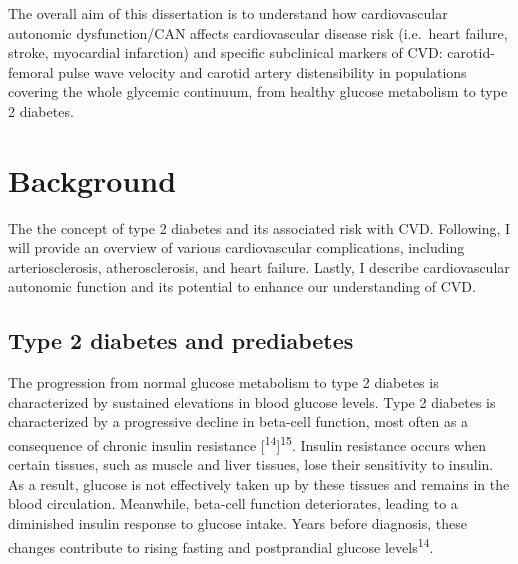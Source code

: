 \documentclass[
  a4paper,
  headsepline=true,
  open=any]{scrbook}
\begin{document}
The overall aim of this dissertation is to understand how cardiovascular
autonomic dysfunction/CAN affects cardiovascular disease risk
(i.e.~heart failure, stroke, myocardial infarction) and specific
subclinical markers of CVD: carotid-femoral pulse wave velocity and
carotid artery distensibility in populations covering the whole glycemic
continuum, from healthy glucose metabolism to type 2 diabetes.


\hypertarget{background}{%
\chapter{Background}\label{background}}

The the concept of type 2 diabetes and its associated risk with CVD.
Following, I will provide an overview of various cardiovascular
complications, including arteriosclerosis, atherosclerosis, and heart
failure. Lastly, I describe cardiovascular autonomic function and its
potential to enhance our understanding of CVD.

\hypertarget{type-2-diabetes-and-prediabetes}{%
\section{Type 2 diabetes and
prediabetes}\label{type-2-diabetes-and-prediabetes}}

The progression from normal glucose metabolism to type 2 diabetes is
characterized by sustained elevations in blood glucose levels. Type 2
diabetes is characterized by a progressive decline in beta-cell
function, most often as a consequence of chronic insulin resistance
{[}\textsuperscript{14}{]}\textsuperscript{15}. Insulin resistance
occurs when certain tissues, such as muscle and liver tissues, lose
their sensitivity to insulin. As a result, glucose is not effectively
taken up by these tissues and remains in the blood circulation.
Meanwhile, beta-cell function deteriorates, leading to a diminished
insulin response to glucose intake. Years before diagnosis, these
changes contribute to rising fasting and postprandial glucose
levels\textsuperscript{14}.
\end{document}
